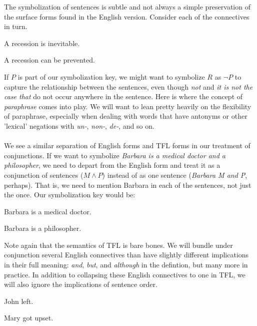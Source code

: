 The symbolization of sentences is subtle and not always a simple preservation
of the surface forms found in the English version. Consider each of the
connectives in turn.

\begin{argument}
\item[R:] A recession is inevitable.
\item[P:] A recession can be prevented.
\end{argument}

If $P$ is part of our symbolization key, we might want to symbolize $R$ as
$\lnot P$ to capture the relationship between the sentences, even though
\textit{not} and \textit{it is not the case that} do not occur anywhere in
the sentence. Here is where the concept of \textit{paraphrase} comes into
play. We will want to lean pretty heavily on the flexibility of paraphrase,
especially when dealing with words that have antonyms or other 'lexical'
negations with \textit{un-}, \textit{non-}, \textit{de-}, and so on. 
\\ \\
We see a similar separation of English forms and TFL forms in our
treatment of conjunctions. If we want to symbolize \textit{Barbara is a medical
  doctor and a philosopher}, we need to depart from the English form and treat
it as a conjunction of sentences ($M \land P$) instead of as one sentence
(\textit{Barbara M and P}, perhaps). That is, we need to mention Barbara in
each of the sentences, not just the once. Our symbolization key would be:

\begin{argument}
\item[M:] Barbara is a medical doctor.
\item[P:] Barbara is a philosopher.  
\end{argument}

Note again that the semantics of TFL is bare bones. We will bundle under
conjunction several English connectives than have slightly different
implications in their full meaning: \textit{and}, \textit{but}, and
\textit{although} in the defintion, but many more in practice. In addition to
collapsing these English connectives to one in TFL, we will also ignore the
implications of sentence order. 

\begin{argument}
\item[A:] John left.
\item[B:] Mary got upset.
\end{argument}

